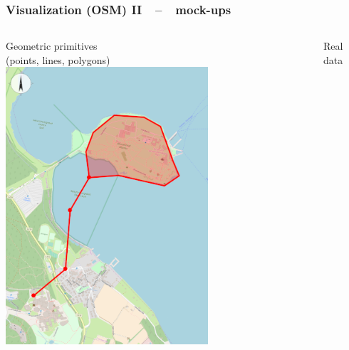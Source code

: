 \documentclass[xcolor=dvipsnames]{beamer}
\begin{document}
\begin{frame}
	\frametitle{\textbf{Visualization (OSM) II}~~--~~mock-ups}
	\begin{columns}
	\begin{column}{0.5\textwidth}
		Geometric primitives\\
		(points, lines, polygons)
		\includegraphics[width=\textwidth]{screenshots/vis-functional-1.png}
	\end{column}
	\begin{column}{0.56\textwidth}
		Real data

\end{column}
\end{columns}
\end{frame}
\end{document}
